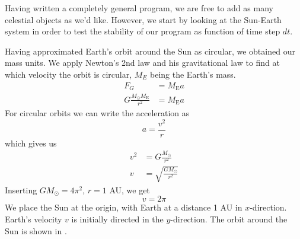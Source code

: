 
Having written a completely general program, we are free to add as many
celestial objects as we'd like. However, we start by looking at the Sun-Earth
system in order to test the stability of our program as function of time step
$dt$.

Having approximated Earth's orbit around the Sun as circular, we obtained our
mass units. We apply Newton's 2nd law and his gravitational law to find at which
velocity the orbit is circular, $M_E$ being the Earth's mass.
%
\begin{align*}
	F_G &= M_{\text{E}}a \\
	G \frac{M_{\odot}M_{\text{E}}}{r^2} &= M_{\text{E}}a
\end{align*}
%
For circular orbits we can write the acceleration as
%
\begin{equation*}
	a = \frac{v^2}{r}
\end{equation*}
which gives us
%
\begin{align*}
	v^2 &= G \frac{M_{\odot}}{r^2} \\
	v &= \sqrt{ \frac{GM_{\odot}}{r^2}}
\end{align*}
%
Inserting $GM_{\odot} = 4\pi^2$, $r = 1$ AU, we get
%
\begin{equation*}
	v = 2\pi
\end{equation*}
%
We place the Sun at the origin, with Earth at a distance 1 AU in $x$-direction.
Earth's velocity $v$ is initially directed in the $y$-direction. The orbit
around the Sun is shown in .
%
%
